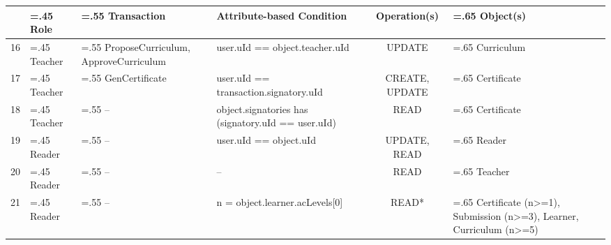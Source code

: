 \begin{landscape}
	\begin{table}
		\begin{tabularx}{24cm}{l>{\hsize=.45\hsize}X>{\hsize=.55\hsize}X>{\hsize=0.9\hsize}Xc>{\hsize=.65\hsize}X}
			   & Role    & Transaction                                   & Attribute-based Condition                                                                   & Operation(s)           & Object(s)                                                                           \\
			\toprule
			16 & Teacher & ProposeCurriculum, \newline ApproveCurriculum & user.uId == object.teacher.uId                                                              & UPDATE                 & Curriculum                                                                          \\
			\midrule
			17 & Teacher & GenCertificate                                & user.uId == transaction.signatory.uId                                                       & CREATE, UPDATE         & Certificate                                                                         \\
			\midrule
			18 & Teacher & --                                            & object.signatories has (signatory.uId == user.uId)                                          & READ                   & Certificate                                                                         \\
			\midrule
			19 & Reader  & --                                            & user.uId == object.uId                                                                      & UPDATE, READ           & Reader                                                                              \\
			\midrule
			20 & Reader  & --                                            & --                                                                                          & READ                   & Teacher                                                                             \\
			\midrule
			21 & Reader  & --                                            & n = object.learner.acLevels[0]                                                              & READ*                  & Certificate (n>=1), \newline Submission (n>=3), \newline Learner, Curriculum (n>=5) \\

\end{tabularx}
\end{table}
\end{landscape}

